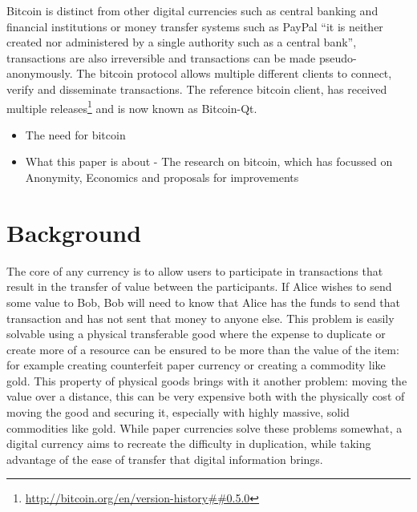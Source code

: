 Bitcoin is distinct from other digital currencies such as central banking
and financial institutions or money transfer systems such as PayPal\cite{paypal}
``it is neither created nor administered by a single authority such as a central bank''\cite{why-interesting}, transactions are also irreversible and transactions can be made pseudo-anonymously.  The bitcoin
protocol allows multiple different clients to connect, verify and disseminate
transactions.  The reference bitcoin client, has received multiple releases\footnote{\url{http://bitcoin.org/en/version-history##0.5.0}} and
is now known as Bitcoin-Qt\cite{bitcoin-qt}.

\begin{itemize} \item The need for bitcoin \item What this paper is about - The
    research on bitcoin, which has focussed on Anonymity, Economics and
    proposals for improvements \end{itemize}

\section{Background}
The core of any currency is to allow users to participate
in transactions that result in the transfer of value between the participants.
If Alice wishes to send some value to Bob, Bob will need to know that Alice has
the funds to send that transaction and has not sent that money to anyone else.
This problem is easily solvable using a physical transferable good where the expense to
duplicate or create more of a resource can be ensured to be more than the value
of the item: for example creating counterfeit paper currency or creating a
commodity like gold.  This property of physical goods brings with it another
problem: moving the value over a distance, this can be very expensive both with
the physically cost of moving the good and securing it, especially
with highly massive, solid commodities like gold. While paper currencies solve
these problems somewhat, a digital currency aims to
recreate the difficulty in duplication, while taking advantage of the ease of
transfer that digital information brings.

